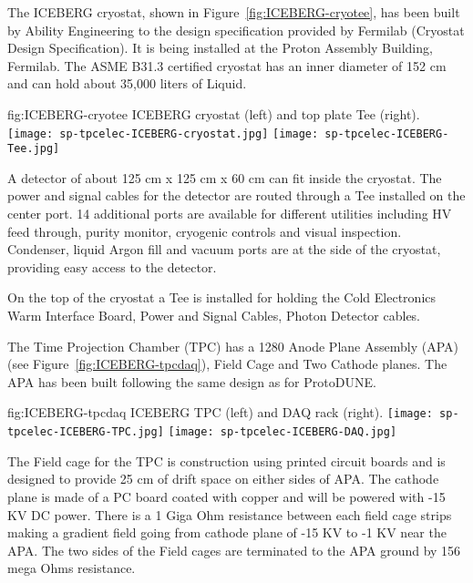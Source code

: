 The ICEBERG cryostat, shown in Figure~\ref{fig:ICEBERG-cryotee}, has been built by Ability Engineering to the design specification provided by Fermilab (Cryostat Design Specification). It is being installed at the Proton Assembly Building, Fermilab. The ASME B31.3 certified cryostat has an inner diameter of 152 cm and can hold about 35,000 liters of Liquid.

\begin{dunefigure}
  {fig:ICEBERG-cryotee}
  {ICEBERG cryostat (left) and top plate Tee (right).}
  \texttt{[image: sp-tpcelec-ICEBERG-cryostat.jpg]}
  \texttt{[image: sp-tpcelec-ICEBERG-Tee.jpg]}
\end{dunefigure}

A detector of about 125 cm x 125 cm x 60 cm can fit inside the cryostat. The power and signal cables for the detector are routed through a Tee installed on the center port. 14 additional ports are available for different utilities including HV feed through, purity monitor, cryogenic controls and visual inspection. Condenser, liquid Argon fill and vacuum ports are at the side of the cryostat, providing easy access to the detector.

On the top of the cryostat a Tee is installed for holding the Cold Electronics Warm Interface Board, Power and Signal Cables, Photon Detector cables.

The Time Projection Chamber (TPC) has a 1280 Anode Plane Assembly (APA) (see Figure~\ref{fig:ICEBERG-tpcdaq}), Field Cage and Two Cathode planes. The APA has been built following the same design as for ProtoDUNE.

\begin{dunefigure}
  {fig:ICEBERG-tpcdaq}
  {ICEBERG TPC (left) and DAQ rack (right).}
  \texttt{[image: sp-tpcelec-ICEBERG-TPC.jpg]}
  \texttt{[image: sp-tpcelec-ICEBERG-DAQ.jpg]}
\end{dunefigure}

The Field cage for the TPC is construction using printed circuit boards and is designed to provide 25 cm of drift space on either sides of APA. The cathode plane is made of a PC board coated with copper and will be powered with -15 KV DC power. There is a 1 Giga Ohm resistance between each field cage strips making a gradient field going from cathode plane of -15 KV to -1 KV near the APA. The two sides of the Field cages are terminated to the APA ground by 156 mega Ohms resistance. 

